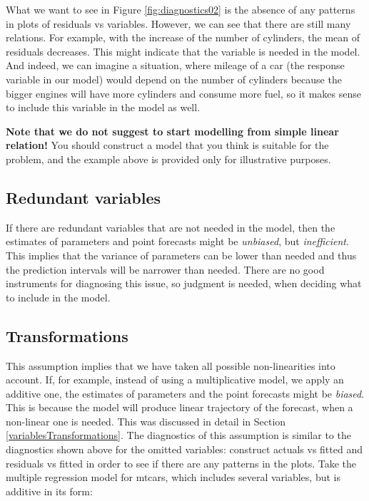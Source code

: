 \documentclass[
]{book}
\theoremstyle{definition}
\theoremstyle{definition}
\theoremstyle{definition}
\theoremstyle{definition}
\theoremstyle{remark}
\begin{document}
What we want to see in Figure \ref{fig:diagnostics02} is the absence of any patterns in plots of residuals vs variables. However, we can see that there are still many relations. For example, with the increase of the number of cylinders, the mean of residuals decreases. This might indicate that the variable is needed in the model. And indeed, we can imagine a situation, where mileage of a car (the response variable in our model) would depend on the number of cylinders because the bigger engines will have more cylinders and consume more fuel, so it makes sense to include this variable in the model as well.

\textbf{Note that we do not suggest to start modelling from simple linear relation!} You should construct a model that you think is suitable for the problem, and the example above is provided only for illustrative purposes.

\subsection{Redundant variables}\label{assumptionsCorrectModelRedundant}

If there are redundant variables that are not needed in the model, then the estimates of parameters and point forecasts might be \emph{unbiased}, but \emph{inefficient}. This implies that the variance of parameters can be lower than needed and thus the prediction intervals will be narrower than needed. There are no good instruments for diagnosing this issue, so judgment is needed, when deciding what to include in the model.

\subsection{Transformations}\label{assumptionsCorrectModelTransformations}

This assumption implies that we have taken all possible non-linearities into account. If, for example, instead of using a multiplicative model, we apply an additive one, the estimates of parameters and the point forecasts might be \emph{biased}. This is because the model will produce linear trajectory of the forecast, when a non-linear one is needed. This was discussed in detail in Section \ref{variablesTransformations}. The diagnostics of this assumption is similar to the diagnostics shown above for the omitted variables: construct actuals vs fitted and residuals vs fitted in order to see if there are any patterns in the plots. Take the multiple regression model for mtcars, which includes several variables, but is additive in its form:
\end{document}
